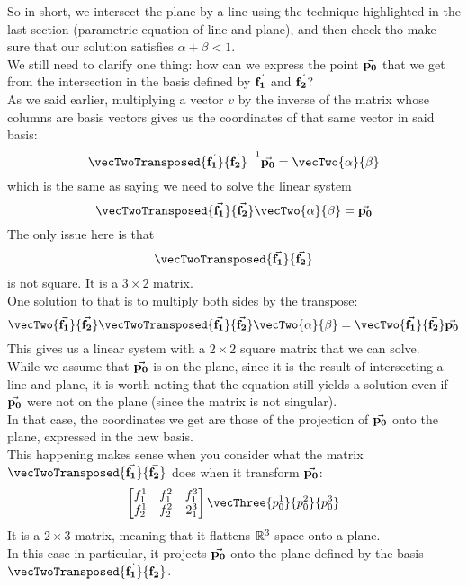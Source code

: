 \documentclass[12pt]{article}
\begin{document}
So in short, we intersect the plane by a line
using the technique highlighted in the last section
(parametric equation of line and plane),
and then check tho make sure that our solution
satisfies $\alpha + \beta < 1$. \\

We still need to clarify one thing:
how can we express the point $\vec{\mathbf{p_0}}$
that we get from the intersection
in the basis defined by $\vec{\mathbf{f_1}}$ and $\vec{\mathbf{f_2}}$? \\
As we said earlier,
multiplying a vector $v$ by the inverse 
of the matrix
whose columns are basis vectors
gives us the coordinates
of that same vector in said basis:
\[ \vecTwoTransposed{\bv{f_1}}{\bv{f_2}}\inv
\bv{p_0} = \vecTwo{\alpha}{\beta} \]
which is the same as saying we need to 
solve the linear system
\[ \vecTwoTransposed{\bv{f_1}}{\bv{f_2}}
\vecTwo{\alpha}{\beta}
= \bv{p_0} \]
The only issue here is that
\[\vecTwoTransposed{\bv{f_1}}{\bv{f_2}}\]
is not square.
It is a $3 \times 2$ matrix. \\
One solution to that is to multiply both sides
by the transpose:
\[ \vecTwo{\bv{f_1}}{\bv{f_2}}
 \vecTwoTransposed{\bv{f_1}}{\bv{f_2}}
\vecTwo{\alpha}{\beta}
= \vecTwo{\bv{f_1}}{\bv{f_2}}\bv{p_0} \]
This gives us a linear system with a $2 \times 2$
square matrix that we can solve. \\

While we assume that $\vec{\mathbf{p_0}}$ is on the plane,
since it is the result of intersecting a line
and plane,
it is worth noting that the equation still yields
a solution even if $\vec{\mathbf{p_0}}$ were not on the plane
(since the matrix is not singular). \\
In that case, the coordinates we get are those
of the projection of $\vec{\mathbf{p_0}}$ onto the plane,
expressed in the new basis. \\

This happening makes sense when you consider
what the matrix
$\vecTwoTransposed{\bv{f_1}}{\bv{f_2}}$
does when it transform $\vec{\mathbf{p_0}}$:
\[ \begin{bmatrix}
    f_1^1 & f_1^2 & f_1^3 \\
    f_2^1 & f_2^2 & 2_1^3
\end{bmatrix} \vecThree{p_0^1}{p_0^2}{p_0^3} \]
It is a $2 \times 3$ matrix,
meaning that it flattens $\mathbb{R}^3$
space onto a plane. \\
In this case in particular,
it projects $\vec{\mathbf{p_0}}$ onto the plane
defined by the basis
$\vecTwoTransposed{\bv{f_1}}{\bv{f_2}}$. \\
\end{document}
